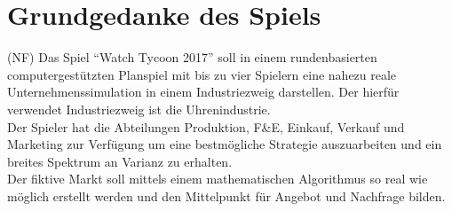\section{Grundgedanke des Spiels}
(NF) Das Spiel \enquote{Watch Tycoon 2017} soll in einem rundenbasierten computergestützten Planspiel mit bis zu vier Spielern eine nahezu reale Unternehmenssimulation in einem Industriezweig darstellen. Der hierfür verwendet Industriezweig ist die Uhrenindustrie.\\
Der Spieler hat die Abteilungen Produktion, F\&E, Einkauf, Verkauf und Marketing zur Verfügung um eine bestmögliche Strategie auszuarbeiten und ein breites Spektrum an Varianz zu erhalten.\\
Der fiktive Markt soll mittels einem mathematischen Algorithmus so real wie möglich erstellt werden und den Mittelpunkt für Angebot und Nachfrage bilden.













